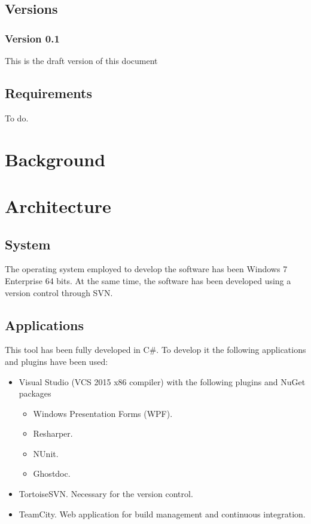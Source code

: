 \documentclass[signature]{deltares_report}
\begin{document}
\section{Versions}
\label{sec:Versions}

\subsection{Version 0.1}
\label{sec:Version}
This is the draft version of this document

\section{Requirements}
\label{sec:requirements}
To do.


\chapter{Background} 
\label{chapterBackground}


\chapter{Architecture} 
\label{chapterArchitecture}

\section{System}
\label{sec:system}
The operating system employed to develop the software has been Windows 7 Enterprise 64 bits. 
At the same time, the software has been developed using a version control through SVN.


\section{Applications}
\label{sec:application}
This tool has been fully developed in C\#. To develop it the following applications and plugins have been used:
\begin{itemize}
	\item Visual Studio (VCS 2015 x86 compiler) with the following plugins and NuGet packages
		\begin{itemize}
			\item Windows Presentation Forms (WPF).
			\item Resharper.
			\item NUnit.
			\item Ghostdoc.
		\end{itemize}
	\item TortoiseSVN. Necessary for the version control.
	\item TeamCity. Web application for build management and continuous integration.
\end{itemize}
\end{document}
